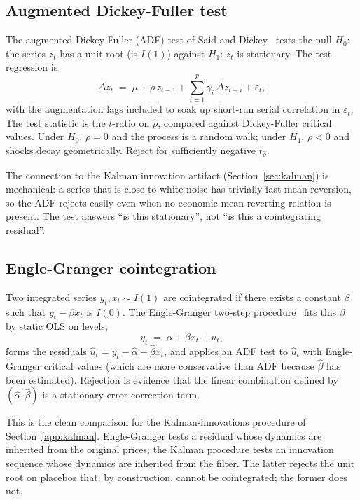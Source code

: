 \documentclass[11pt]{article}
\begin{document}
\subsection{Augmented Dickey-Fuller test}
\label{app:adf}

The augmented Dickey-Fuller (ADF) test of Said and Dickey~\cite{saiddickey1984} tests the
null $H_0$: the series $z_t$ has a unit root (is $I(1)$) against $H_1$: $z_t$ is
stationary. The test regression is
\[
\Delta z_t \;=\; \mu + \rho \, z_{t-1} + \sum_{i=1}^{p} \gamma_i \, \Delta z_{t-i} + \varepsilon_t,
\]
with the augmentation lags included to soak up short-run serial correlation in
$\varepsilon_t$. The test statistic is the $t$-ratio on $\hat{\rho}$, compared against
Dickey-Fuller critical values. Under $H_0$, $\rho = 0$ and the process is a random walk;
under $H_1$, $\rho < 0$ and shocks decay geometrically. Reject for sufficiently negative
$t_{\hat\rho}$.

The connection to the Kalman innovation artifact (Section~\ref{sec:kalman}) is mechanical: a
series that is close to white noise has trivially fast mean reversion, so the ADF rejects
easily even when no economic mean-reverting relation is present. The test answers ``is this
stationary'', not ``is this a cointegrating residual''.

\subsection{Engle-Granger cointegration}
\label{app:eg}

Two integrated series $y_t, x_t \sim I(1)$ are cointegrated if there exists a constant
$\beta$ such that $y_t - \beta x_t$ is $I(0)$. The Engle-Granger two-step
procedure~\cite{engle1987cointegration} fits this $\beta$ by static OLS on levels,
\[
y_t \;=\; \alpha + \beta x_t + u_t,
\]
forms the residuals $\hat{u}_t = y_t - \hat\alpha - \hat\beta x_t$, and applies an ADF test
to $\hat{u}_t$ with Engle-Granger critical values (which are more conservative than ADF
because $\hat\beta$ has been estimated). Rejection is evidence that the linear combination
defined by $(\hat\alpha, \hat\beta)$ is a stationary error-correction term.

This is the clean comparison for the Kalman-innovations procedure of
Section~\ref{app:kalman}. Engle-Granger tests a residual whose dynamics are inherited from
the original prices; the Kalman procedure tests an innovation sequence whose dynamics are
inherited from the filter. The latter rejects the unit root on placebos that, by
construction, cannot be cointegrated; the former does not.
\end{document}
